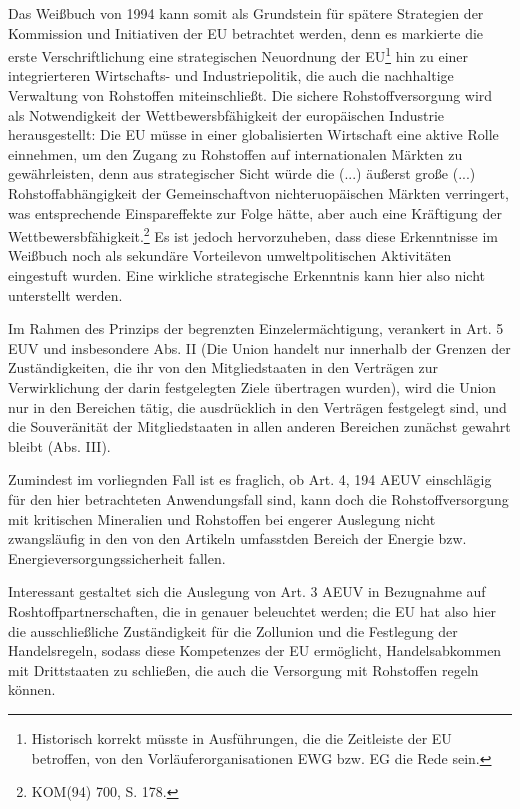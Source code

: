 \documentclass[12pt,a4paper,oneside]{book} %
\begin{document}
	Das Weißbuch von 1994 kann somit als Grundstein für spätere Strategien der Kommission und Initiativen der EU betrachtet werden, denn es markierte die erste Verschriftlichung eine strategischen Neuordnung der EU\footnote{Historisch korrekt müsste in Ausführungen, die die Zeitleiste der EU betroffen, von den Vorläuferorganisationen EWG bzw. EG die Rede sein.} hin zu einer integrierteren Wirtschafts- und Industriepolitik, die auch die nachhaltige Verwaltung von Rohstoffen miteinschließt. Die sichere Rohstoffversorgung wird als Notwendigkeit der Wettbewersbfähigkeit der europäischen Industrie herausgestellt: Die EU müsse in einer globalisierten Wirtschaft eine aktive Rolle einnehmen, um den Zugang zu  Rohstoffen auf internationalen Märkten zu gewährleisten, denn aus strategischer Sicht würde die \glqq (...) äußerst große (...) Rohstoffabhängigkeit der Gemeinschaft\grqq von nichteruopäischen Märkten verringert, was entsprechende Einspareffekte zur Folge hätte, aber auch eine Kräftigung der Wettbewersbfähigkeit.\footnote{KOM(94) 700, S. 178.} Es ist jedoch hervorzuheben, dass diese Erkenntnisse im Weißbuch noch als \glqq sekundäre Vorteile\grqq von umweltpolitischen Aktivitäten eingestuft wurden. Eine wirkliche strategische Erkenntnis kann hier also nicht unterstellt werden.
	
	Im Rahmen des Prinzips der begrenzten Einzelermächtigung, verankert in Art. 5 EUV  und insbesondere Abs. II (Die Union handelt nur innerhalb der Grenzen der Zuständigkeiten, die ihr von den Mitgliedstaaten in den Verträgen zur Verwirklichung der darin festgelegten Ziele übertragen wurden), wird die Union nur in den Bereichen tätig, die ausdrücklich in den Verträgen festgelegt sind, und  die Souveränität der Mitgliedstaaten in allen anderen Bereichen zunächst gewahrt bleibt (Abs. III).
	
	Zumindest im vorliegnden Fall ist es fraglich, ob Art. 4, 194 AEUV einschlägig für den hier betrachteten Anwendungsfall sind, kann doch die Rohstoffversorgung mit kritischen Mineralien und Rohstoffen bei engerer Auslegung nicht zwangsläufig in den von den Artikeln umfasstden Bereich der Energie bzw. Energieversorgungssicherheit fallen.
	
	Interessant gestaltet sich die Auslegung von Art. 3 AEUV in Bezugnahme auf Roshtoffpartnerschaften, die in %
	genauer beleuchtet werden; die EU hat also hier die ausschließliche Zuständigkeit für die Zollunion und die Festlegung der Handelsregeln, sodass diese Kompetenzes der EU ermöglicht, Handelsabkommen mit Drittstaaten zu schließen, die auch die Versorgung mit Rohstoffen regeln können.
	
\end{document}
